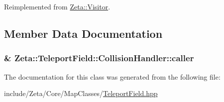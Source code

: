 Reimplemented from \hyperlink{classZeta_1_1Visitor_ad7030244adc72eaafdd98ebaade80a71}{Zeta\+::\+Visitor}.



\subsection{Member Data Documentation}
\hypertarget{classZeta_1_1TeleportField_1_1CollisionHandler_a77c025b99e8a0c447cabc24896ed1b6d}{
\subsubsection[{caller}]{\& Zeta\+::\+Teleport\+Field\+::\+Collision\+Handler\+::caller\hspace{0.3cm}{\ttfamily [private]}}}\label{classZeta_1_1TeleportField_1_1CollisionHandler_a77c025b99e8a0c447cabc24896ed1b6d}


The documentation for this class was generated from the following file\+:\begin{DoxyCompactItemize}
\item 
include/\+Zeta/\+Core/\+Map\+Classes/\hyperlink{TeleportField_8hpp}{Teleport\+Field.\+hpp}\end{DoxyCompactItemize}
